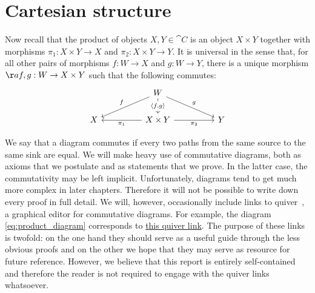 \section{Cartesian structure}\label{sec:cartesian_categories}

Now recall that the product of objects $X,Y\in\cat{C}$ is an object $X\times Y$
together with morphisms $\pi_1 : X\times Y \to X$ and $\pi_2 : X\times Y \to
Y$. It is universal in the sense that, for all other pairs of morphisms $f:W\to
X$ and $g:W\to Y$, there is a unique morphism $\aa{f,g}:W\to X\times Y$ such
that the following commutes:
\begin{equation}\label{eq:product_diagram}
  \begin{tikzcd}
  && W \\
    X && {X\times Y} && Y
    \arrow["{\pi_2}"', from=2-3, to=2-5]
    \arrow["{\pi_1}", from=2-3, to=2-1]
    \arrow["{\langle f,g\rangle}"{description}, from=1-3, to=2-3]
    \arrow["f"', from=1-3, to=2-1]
    \arrow["g", from=1-3, to=2-5]
  \end{tikzcd}
\end{equation}

We say that a diagram commutes if every two paths from the same source to the
same sink are equal. We will make heavy use of commutative diagrams, both as
axioms that we postulate and as statements that we prove. In the latter case,
the commutativity may be left implicit. Unfortunately, diagrams tend to get
much more complex in later chapters. Therefore it will not be possible to write
down every proof in full detail. We will, however, occasionally include links
to quiver~\cite{quiver}, a graphical editor for commutative diagrams. For
example, the diagram \ref{eq:product_diagram} corresponds to \href{
  https://q.uiver.app/?q=WzAsNCxbMiwwLCJXIl0sWzIsMSwiWFxcdGltZXMgWSJdLFswLDEsIlgiXSxbNCwxLCJZIl0sWzEsMywiXFxwaV8yIiwyXSxbMSwyLCJcXHBpXzEiXSxbMCwxLCJcXGxhbmdsZSBmLGdcXHJhbmdsZSIsMV0sWzAsMiwiZiIsMl0sWzAsMywiZyJdXQ==
}{this quiver link}. The purpose of these links is twofold: on the one hand
they should serve as a useful guide through the less obvious proofs and on the
other we hope that they may serve as resource for future reference. However, we
believe that this report is entirely self-contained and therefore the reader is
not required to engage with the quiver links whatsoever.

